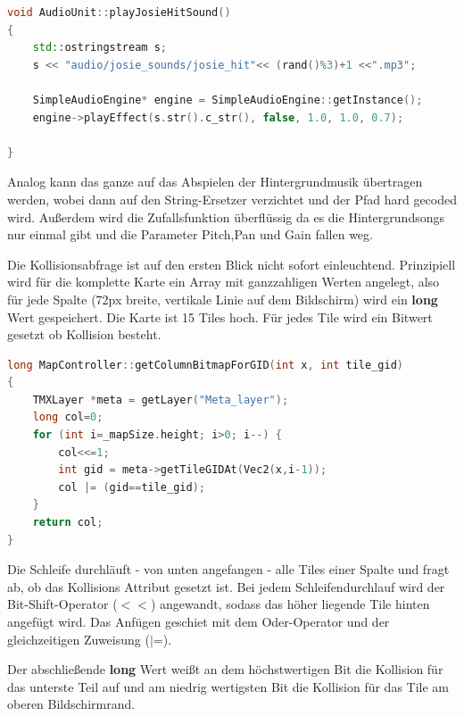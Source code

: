 \begin{lstlisting}[label=lst:playJosieShootSound,
				   language=C++,
				   firstnumber=30,
				   caption=BossLevel Shoot Sound abspielen ( AudioUnit.cpp )]
void AudioUnit::playJosieHitSound()
{
	std::ostringstream s;
	s << "audio/josie_sounds/josie_hit"<< (rand()%3)+1 <<".mp3";

	SimpleAudioEngine* engine = SimpleAudioEngine::getInstance();
	engine->playEffect(s.str().c_str(), false, 1.0, 1.0, 0.7);
	
}
\end{lstlisting}

Analog kann das ganze auf das Abspielen der Hintergrundmusik übertragen werden, wobei dann auf den String-Ersetzer verzichtet und der Pfad hard gecoded wird. Außerdem wird die Zufallsfunktion überflüssig da es die Hintergrundsongs nur einmal gibt und die Parameter Pitch,Pan und Gain fallen weg.



\label{sec:4_Kollisionsabfrage}

Die Kollisionsabfrage ist auf den ersten Blick nicht sofort einleuchtend. Prinzipiell wird für die komplette Karte ein Array mit ganzzahligen Werten angelegt, also für jede Spalte (72px breite, vertikale Linie auf dem Bildschirm) wird ein \textbf{long} Wert gespeichert.
Die Karte ist 15 Tiles hoch. Für jedes Tile wird ein Bitwert gesetzt ob Kollision besteht.

\begin{lstlisting}[label=lst:collision_detection,
				   language=C++,
				   firstnumber=271,
				   caption=Collision Column abfragen ( MapController.cpp )]
long MapController::getColumnBitmapForGID(int x, int tile_gid)
{
	TMXLayer *meta = getLayer("Meta_layer");
	long col=0;
	for (int i=_mapSize.height; i>0; i--) {
		col<<=1;
		int gid = meta->getTileGIDAt(Vec2(x,i-1));
		col |= (gid==tile_gid);
	}
	return col;
}
\end{lstlisting}

Die Schleife durchläuft - von unten angefangen - alle Tiles einer Spalte und fragt ab, ob das Kollisions Attribut gesetzt ist. Bei jedem Schleifendurchlauf wird der Bit-Shift-Operator ($<<$) angewandt, sodass das höher liegende Tile hinten angefügt wird. Das Anfügen geschiet mit dem Oder-Operator und der gleichzeitigen Zuweisung ($|$=).

Der abschließende \textbf{long} Wert weißt an dem höchstwertigen Bit die Kollision für das unterste Teil auf und am niedrig wertigsten Bit die Kollision für das Tile am oberen Bildschirmrand.

